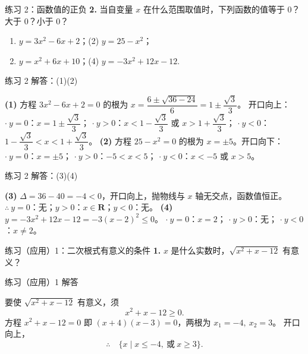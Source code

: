 \documentclass[10pt,aspectratio=169,serif]{beamer}
\begin{document}
\begin{frame}[t]{练习 2：函数值的正负}
\textbf{2.} 当自变量 $x$ 在什么范围取值时，下列函数的值等于 $0$？大于 $0$？小于 $0$？
\begin{enumerate}
  \item $y=3x^{2}-6x+2$；\qquad (2) $y=25-x^{2}$；
  \item $y=x^{2}+6x+10$；\qquad (4) $y=-3x^{2}+12x-12$.
\end{enumerate}
\end{frame}

\begin{frame}[t]{练习 2 解答：(1)(2)}
\begin{tcolorbox}[colback=orange!10,colframe=orange,title=\textbf{解}]
\textbf{(1)} 方程 $3x^{2}-6x+2=0$ 的根为
$x=\dfrac{6\pm\sqrt{36-24}}{6}=1\pm\dfrac{\sqrt{3}}{3}$。
开口向上：
$\cdot\ y=0$：$x=1\pm\dfrac{\sqrt{3}}{3}$；
$\cdot\ y>0$：$x<1-\dfrac{\sqrt{3}}{3}$ 或 $x>1+\dfrac{\sqrt{3}}{3}$；
$\cdot\ y<0$：$1-\dfrac{\sqrt{3}}{3}<x<1+\dfrac{\sqrt{3}}{3}$。
\vspace{0.5em}
\textbf{(2)} 方程 $25-x^{2}=0$ 的根为 $x=\pm 5$。开口向下：
$\cdot\ y=0$：$x=\pm 5$；
$\cdot\ y>0$：$-5<x<5$；
$\cdot\ y<0$：$x<-5$ 或 $x>5$。
\end{tcolorbox}
\end{frame}

\begin{frame}[t]{练习 2 解答：(3)(4)}
\begin{tcolorbox}[colback=orange!10,colframe=orange,title=\textbf{解}]
\textbf{(3)} $\Delta = 36-40=-4<0$，开口向上，抛物线与 $x$ 轴无交点，函数值恒正。
$\therefore\ y=0$：无；$y>0$：$x\in\mathbf{R}$；$y<0$：无。
\vspace{0.5em}
\textbf{(4)} $y=-3x^{2}+12x-12=-3(x-2)^{2}\le 0$。
$\cdot\ y=0$：$x=2$；
$\cdot\ y>0$：无；
$\cdot\ y<0$：$x\neq 2$。
\end{tcolorbox}
\end{frame}

\begin{frame}[t]{练习（应用）1：二次根式有意义的条件}
\textbf{1.} $x$ 是什么实数时，$\sqrt{x^{2}+x-12}$ 有意义？
\end{frame}

\begin{frame}[t]{练习（应用）1 解答}
\begin{tcolorbox}[colback=orange!10,colframe=orange,title=\textbf{解}]
要使 $\sqrt{x^{2}+x-12}$ 有意义，须
\[
x^{2}+x-12\ge 0.
\]
方程 $x^{2}+x-12=0$ 即 $(x+4)(x-3)=0$，两根为 $x_{1}=-4,\ x_{2}=3$。
开口向上，
\[
\therefore\quad \{x\mid x\le -4,\ \text{或}\ x\ge 3\}.
\]
\end{tcolorbox}
\end{frame}
\end{document}
